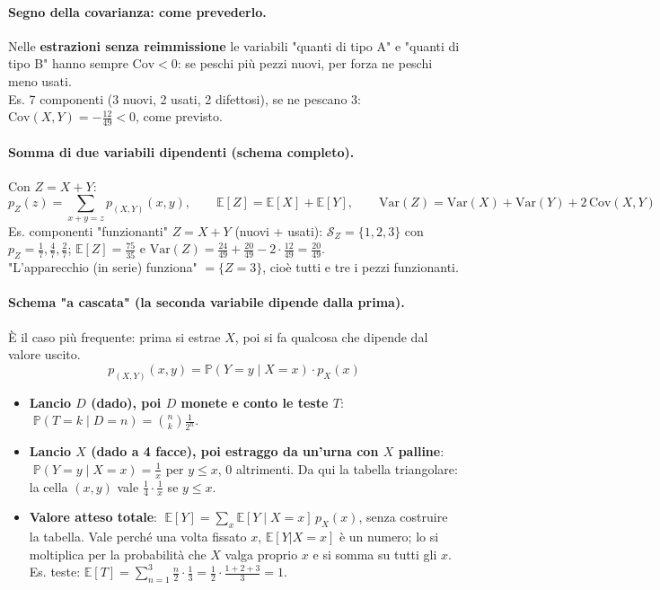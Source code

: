 \documentclass[12pt]{extarticle} %
\begin{document}
\paragraph{Segno della covarianza: come prevederlo.} Nelle \textbf{estrazioni senza reimmissione} le variabili "quanti di tipo A" e "quanti di tipo B" hanno sempre $\mathrm{Cov} < 0$: se peschi più pezzi nuovi, per forza ne peschi meno usati. \\
{\footnotesize Es. 7 componenti (3 nuovi, 2 usati, 2 difettosi), se ne pescano 3: $\mathrm{Cov}(X,Y) = -\frac{12}{49} < 0$, come previsto.}

\paragraph{Somma di due variabili dipendenti (schema completo).} Con $Z = X+Y$:
$$ p_Z(z) = \sum_{x+y = z} p_{(X,Y)}(x,y), \qquad \mathbb{E}[Z] = \mathbb{E}[X]+\mathbb{E}[Y], \qquad \mathrm{Var}(Z) = \mathrm{Var}(X)+\mathrm{Var}(Y)+2\,\mathrm{Cov}(X,Y) $$
{\footnotesize Es. componenti "funzionanti" $Z = X+Y$ (nuovi + usati): $\mathcal{S}_Z = \{1,2,3\}$ con $p_Z = \frac17, \frac47, \frac27$; $\mathbb{E}[Z] = \frac{75}{35}$ e $\mathrm{Var}(Z) = \frac{24}{49}+\frac{20}{49}-2\cdot\frac{12}{49} = \frac{20}{49}$. \\ "L'apparecchio (in serie) funziona" $= \{Z = 3\}$, cioè tutti e tre i pezzi funzionanti.}

\paragraph{Schema "a cascata" (la seconda variabile dipende dalla prima).} È il caso più frequente: prima si estrae $X$, poi si fa qualcosa che dipende dal valore uscito.
$$ p_{(X,Y)}(x,y) = \mathbb{P}(Y = y \mid X = x) \cdot p_X(x) $$
\begin{itemize}[-]
    \item \textbf{Lancio $D$ (dado), poi $D$ monete e conto le teste $T$}: $\;\mathbb{P}(T=k \mid D=n) = \binom{n}{k}\frac{1}{2^n}$.
    \item \textbf{Lancio $X$ (dado a 4 facce), poi estraggo da un'urna con $X$ palline}: $\;\mathbb{P}(Y=y \mid X=x) = \frac1x$ per $y \le x$, $0$ altrimenti. {\footnotesize Da qui la tabella triangolare: la cella $(x,y)$ vale $\frac14 \cdot \frac1x$ se $y \le x$.}
    \item \textbf{Valore atteso totale}: $\;\mathbb{E}[Y] = \sum_x \mathbb{E}[Y \mid X=x]\, p_X(x)$, senza costruire la tabella. {\footnotesize Vale perché una volta fissato $x$, $\mathbb{E}[Y|X=x]$ è un numero; lo si moltiplica per la probabilità che $X$ valga proprio $x$ e si somma su tutti gli $x$.} {\footnotesize Es. teste: $\mathbb{E}[T] = \sum_{n=1}^{3} \frac{n}{2}\cdot\frac13 = \frac12 \cdot \frac{1+2+3}{3} = 1$.}
\end{itemize}
\end{document}
